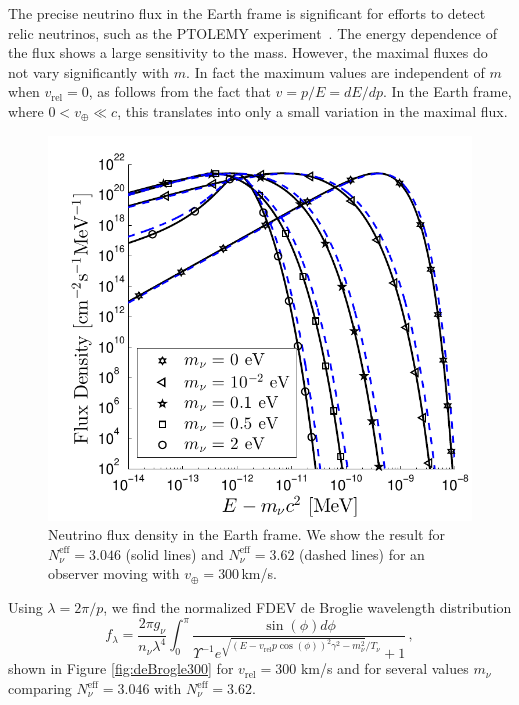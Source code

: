 The precise neutrino flux in the Earth frame is significant for efforts to detect relic neutrinos, such as the PTOLEMY experiment~\cite{Betts:2013uya}. The energy dependence of the flux shows a large sensitivity to the mass. However, the maximal fluxes do not vary significantly with $m$. In fact the maximum values are independent of $m$ when $v_{\text{rel}}=0$, as follows from the fact that $v=p/E=dE/dp$.  In the Earth frame, where $0<v_\oplus\ll c$, this translates into only a small variation in the maximal flux.

\begin{figure}
\centerline{\includegraphics[width=0.9\linewidth]{plots/flux_dist.pdf}}
\caption{Neutrino flux density in the Earth frame. We show the result for $N_\nu^{\mathrm{eff}}=3.046$ (solid lines) and $N_\nu^{\mathrm{eff}}=3.62$ (dashed lines) for an observer moving with $v_\oplus=300$\,km/s. }
\label{fig:fluxDist}
 \end{figure}

Using $\lambda=2\pi/p$, we find  the normalized FDEV de Broglie wavelength distribution
\begin{equation}
f_\lambda=\frac{ 2\pi g_\nu}{n_\nu\lambda^4}\!\!\int_0^\pi\!\!\! \!\frac{\sin(\phi) d\phi}{\Upsilon^{-1}e^{\sqrt{( E-v_{\text{rel}} p \cos(\phi))^2\gamma^2-m_\nu^2}/T_\nu}\!\!+\!1}\,,
\end{equation}
shown in Figure \ref{fig:deBrogle300} for $v_{\text{rel}}=300$ km/s and for several values $m_\nu$ comparing  $N_\nu^{\mathrm{eff}}=3.046$ with $N_\nu^{\mathrm{eff}}=3.62$. 

